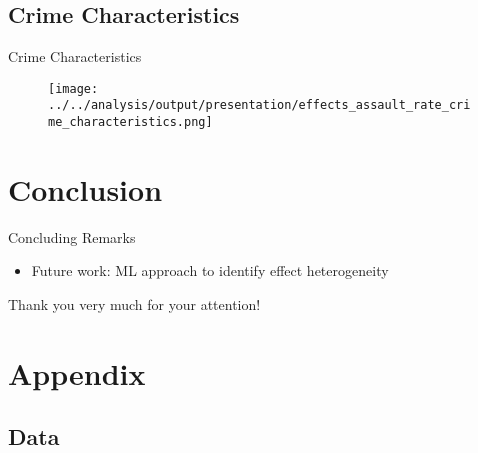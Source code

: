 \documentclass[usenames,dvipsnames]{beamer} %
\begin{document}
	\subsection{Crime Characteristics}
	\begin{frame}{Crime Characteristics}
		\begin{figure}
			\texttt{[image: ../../analysis/output/presentation/effects\_assault\_rate\_crime\_characteristics.png]}
		\end{figure}
	\end{frame}


\section{Conclusion}

\begin{frame}{Concluding Remarks}
	\begin{itemize}
		\item Future work: ML approach to identify effect heterogeneity
	\end{itemize}
\end{frame}


\begin{frame}
	\begin{center}
		Thank you very much for your attention!
	\end{center}
\end{frame}


\section*{Appendix}
\subsection*{Data}

\end{document}
